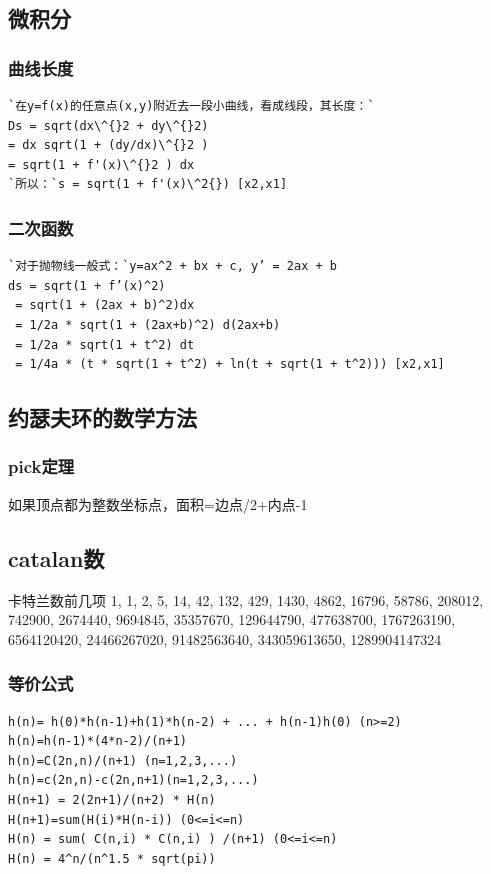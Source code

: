 \documentclass[a4paper]{article}
\begin{document}
\begin{CJK*}{UTF8}{gbsn}
\begin{multicols}{3}
\begin{flushleft}
\subsection{微积分}

\subsubsection{曲线长度}
\begin{lstlisting}
`在y=f(x)的任意点(x,y)附近去一段小曲线，看成线段，其长度：`
Ds = sqrt(dx\^{}2 + dy\^{}2) 
= dx sqrt(1 + (dy/dx)\^{}2 )
= sqrt(1 + f'(x)\^{}2 ) dx
`所以：`s = sqrt(1 + f'(x)\^2{}) [x2,x1]
\end{lstlisting}

\subsubsection{二次函数}
\begin{lstlisting}
`对于抛物线一般式：`y=ax^2 + bx + c, y’ = 2ax + b
ds = sqrt(1 + f’(x)^2)
 = sqrt(1 + (2ax + b)^2)dx 
 = 1/2a * sqrt(1 + (2ax+b)^2) d(2ax+b)
 = 1/2a * sqrt(1 + t^2) dt
 = 1/4a * (t * sqrt(1 + t^2) + ln(t + sqrt(1 + t^2))) [x2,x1]
\end{lstlisting}

\subsection{约瑟夫环的数学方法}


\subsubsection{pick定理}
如果顶点都为整数坐标点，面积=边点/2+内点-1\\

\subsection{catalan数}
卡特兰数前几项
1, 1, 2, 5, 14, 42, 132, 429, 1430, 4862, 16796, 58786, 208012, 742900, 2674440, 9694845, 35357670, 129644790, 477638700, 1767263190, 6564120420, 24466267020, 91482563640, 343059613650, 1289904147324 

\subsubsection{等价公式}
\begin{lstlisting}
h(n)= h(0)*h(n-1)+h(1)*h(n-2) + ... + h(n-1)h(0) (n>=2)
h(n)=h(n-1)*(4*n-2)/(n+1)
h(n)=C(2n,n)/(n+1) (n=1,2,3,...)
h(n)=c(2n,n)-c(2n,n+1)(n=1,2,3,...)
H(n+1) = 2(2n+1)/(n+2) * H(n)
H(n+1)=sum(H(i)*H(n-i)) (0<=i<=n)
H(n) = sum( C(n,i) * C(n,i) ) /(n+1) (0<=i<=n)
H(n) = 4^n/(n^1.5 * sqrt(pi))
\end{lstlisting}


\end{flushleft}
\end{multicols}
\end{CJK*}
\end{document}
